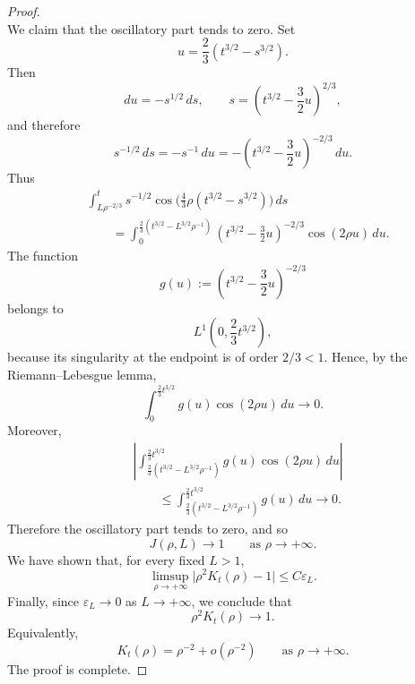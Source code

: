 \documentclass[10pt,a4paper]{amsart}
\begin{document}
\begin{proof}
\[\]
We claim that the oscillatory part tends to zero. Set
\[
  u=\frac23(t^{3/2}-s^{3/2}).
\]
Then
\[
  du=-s^{1/2}\,ds,
  \qquad
  s=\left(t^{3/2}-\frac32u\right)^{2/3},
\]
and therefore
\[
  s^{-1/2}\,ds
  =
  -s^{-1}\,du
  =
  -\left(t^{3/2}-\frac32u\right)^{-2/3}\,du .
\]
Thus
\[
\begin{aligned}
&\int_{L\rho^{-2/3}}^t
s^{-1/2}
\cos\Big(\frac43\rho(t^{3/2}-s^{3/2})\Big)\,ds      \\
&\qquad =
\int_0^{\frac23(t^{3/2}-L^{3/2}\rho^{-1})}
\left(t^{3/2}-\frac32u\right)^{-2/3}
\cos(2\rho u)\,du .
\end{aligned}
\]
The function
\[
  g(u):=
  \left(t^{3/2}-\frac32u\right)^{-2/3}
\]
belongs to
\[
  L^1\left(0,\frac23t^{3/2}\right),
\]
because its singularity at the endpoint is of order \(2/3<1\). Hence, by the Riemann--Lebesgue lemma,
\[
  \int_0^{\frac23t^{3/2}}
  g(u)\cos(2\rho u)\,du
  \longrightarrow 0 .
\]
Moreover,
\[
\begin{aligned}
&\left|
\int_{\frac23(t^{3/2}-L^{3/2}\rho^{-1})}^{\frac23t^{3/2}}
g(u)\cos(2\rho u)\,du
\right|        \\
&\qquad \le
\int_{\frac23(t^{3/2}-L^{3/2}\rho^{-1})}^{\frac23t^{3/2}}
g(u)\,du
\longrightarrow 0 .
\end{aligned}
\]
Therefore the oscillatory part tends to zero, and so
\[
  J(\rho,L)\longrightarrow 1
  \qquad \text{as } \rho\to+\infty .
\]
We have shown that, for every fixed \(L>1\),
\[
  \limsup_{\rho\to+\infty}
  \bigl|\rho^2K_t(\rho)-1\bigr|
  \le C\varepsilon_L .
\]
Finally, since \(\varepsilon_L\to0\) as \(L\to+\infty\), we conclude that
\[
  \rho^2K_t(\rho)\longrightarrow 1 .
\]
Equivalently,
\[
  K_t(\rho)=\rho^{-2}+o(\rho^{-2})
  \qquad \text{as } \rho\to+\infty .
\]
The proof is complete.
\end{proof}
\end{document}
